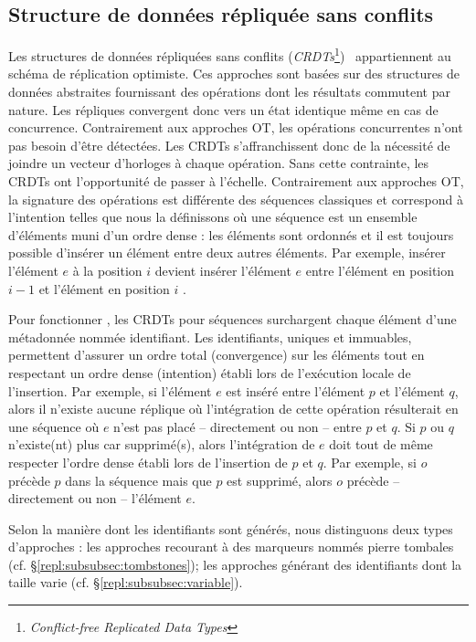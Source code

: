 \subsection{Structure de données répliquée sans conflits}
\label{repl:subsec:crdts}

Les structures de données répliquées sans conflits
(\emph{CRDTs}\footnote{\emph{Conflict-free Replicated Data
    Types}})~\cite{shapiro2011comprehensive, shapiro2011conflict} appartiennent
au schéma de réplication optimiste. Ces approches sont basées sur des structures
de données abstraites fournissant des opérations dont les résultats commutent
par nature. Les répliques convergent donc vers un état identique même en cas de
concurrence. Contrairement aux approches OT, les opérations concurrentes n'ont
pas besoin d'être détectées. Les CRDTs s'affranchissent donc de la nécessité de
joindre un vecteur d'horloges à chaque opération. Sans cette contrainte, les
CRDTs ont l'opportunité de passer à l'échelle. Contrairement aux approches OT,
la signature des opérations est différente des séquences \og classiques \fg et
correspond à l'intention telles que nous la définissons où une séquence est un
ensemble d'éléments muni d'un ordre dense : les éléments sont ordonnés et il est
toujours possible d'insérer un élément entre deux autres éléments. Par exemple,
\og insérer l'élément $e$ à la position $i$ \fg devient \og insérer l'élément
$e$ entre l'élément en position $i-1$ et l'élément en position $i$ \fg.

Pour fonctionner , les CRDTs pour séquences surchargent chaque élément d'une
métadonnée nommée identifiant. Les identifiants, uniques et immuables,
permettent d'assurer un ordre total (convergence) sur les éléments tout en
respectant un ordre dense (intention) établi lors de l'exécution locale de
l'insertion. Par exemple, si l'élément $e$ est inséré entre l'élément $p$ et
l'élément $q$, alors il n'existe aucune réplique où l'intégration de cette
opération résulterait en une séquence où $e$ n'est pas placé -- directement ou
non -- entre $p$ et $q$.  Si $p$ ou $q$ n'existe(nt) plus car supprimé(s), alors
l'intégration de $e$ doit tout de même respecter l'ordre dense établi lors de
l'insertion de $p$ et $q$. Par exemple, si $o$ précède $p$ dans la séquence mais
que $p$ est supprimé, alors $o$ précède -- directement ou non -- l'élément $e$.

Selon la manière dont les identifiants sont générés, nous distinguons deux types
d'approches : les approches recourant à des marqueurs nommés \og pierre tombales
\fg (cf. §\ref{repl:subsubsec:tombstones}); les approches générant des
identifiants dont la taille varie (cf. §\ref{repl:subsubsec:variable}).

